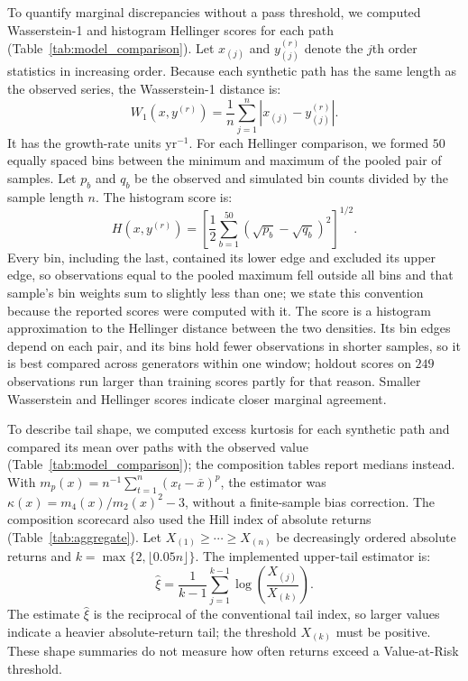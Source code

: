To quantify marginal discrepancies without a pass threshold, we
computed Wasserstein-1 and histogram Hellinger scores for each path
(Table~\ref{tab:model_comparison}). Let $x_{(j)}$ and $y^{(r)}_{(j)}$
denote the $j$th order statistics in increasing order. Because each
synthetic path has the same length as the observed series, the
Wasserstein-1 distance is:
\begin{equation}
 W_1(x,y^{(r)})=\frac{1}{n}\sum_{j=1}^{n}
       |x_{(j)}-y^{(r)}_{(j)}|.
 \label{eq:wasserstein}
\end{equation}
It has the growth-rate units $\mathrm{yr}^{-1}$. For each Hellinger
comparison, we formed $50$ equally spaced bins between the minimum
and maximum of the pooled pair of samples. Let $p_b$ and $q_b$ be
the observed and simulated bin counts divided by the sample length
$n$. The histogram score is:
\begin{equation}
 H(x,y^{(r)})=\left[\frac{1}{2}\sum_{b=1}^{50}
          (\sqrt{p_b}-\sqrt{q_b})^2\right]^{1/2}.
 \label{eq:hellinger}
\end{equation}
Every bin, including the last, contained its lower edge and excluded
its upper edge, so observations equal to the pooled maximum fell
outside all bins and that sample's bin weights sum to slightly less
than one; we state this convention because the reported scores were
computed with it. The score is a histogram approximation to the
Hellinger distance between the two densities. Its bin edges depend on
each pair, and its bins hold fewer observations in shorter samples, so
it is best compared across generators within one window; holdout
scores on $249$ observations run larger than training scores partly
for that reason. Smaller Wasserstein and Hellinger scores indicate
closer marginal agreement.

To describe tail shape, we computed excess kurtosis for each
synthetic path and compared its mean over paths with the observed value
(Table~\ref{tab:model_comparison}); the composition tables report
medians instead. With
$m_p(x)=n^{-1}\sum_{t=1}^{n}(x_t-\bar x)^p$, the estimator was
$\kappa(x)=m_4(x)/m_2(x)^2-3$, without a finite-sample bias
correction. The composition scorecard also used the Hill index of
absolute returns (Table~\ref{tab:aggregate}). Let
$X_{(1)}\ge\cdots\ge X_{(n)}$ be decreasingly ordered absolute
returns and $k=\max\{2,\lfloor0.05n\rfloor\}$. The implemented
upper-tail estimator is:
\begin{equation}
 \hat\xi=\frac{1}{k-1}\sum_{j=1}^{k-1}
             \log\!\left(\frac{X_{(j)}}{X_{(k)}}\right).
 \label{eq:hill}
\end{equation}
The estimate $\hat\xi$ is the reciprocal of the conventional tail
index, so larger values indicate a heavier absolute-return tail; the
threshold $X_{(k)}$ must be positive. These shape summaries do not
measure how often returns exceed a Value-at-Risk threshold.


